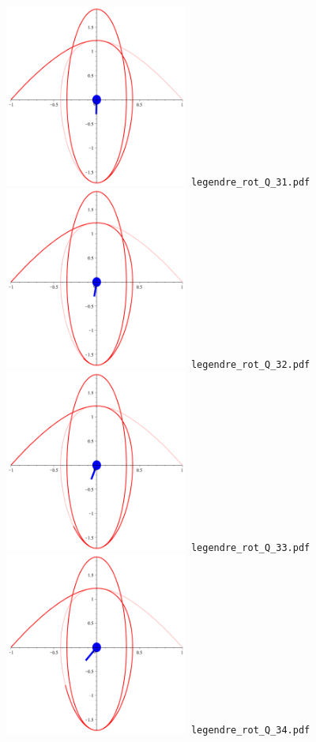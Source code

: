 \documentclass[a4paper]{amsart}
\begin{document}
\includegraphics[width=6cm]{legendre_rot_Q_31.pdf}\verb+ legendre_rot_Q_31.pdf+\\
\includegraphics[width=6cm]{legendre_rot_Q_32.pdf}\verb+ legendre_rot_Q_32.pdf+\\
\includegraphics[width=6cm]{legendre_rot_Q_33.pdf}\verb+ legendre_rot_Q_33.pdf+\\
\includegraphics[width=6cm]{legendre_rot_Q_34.pdf}\verb+ legendre_rot_Q_34.pdf+\\
\end{document}
